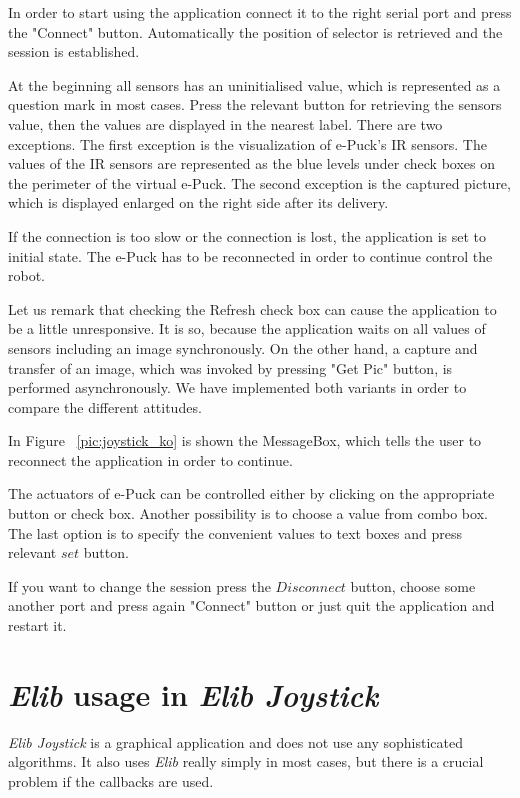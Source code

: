 	In order to start using the application connect it to the right serial port and press the "Connect" button.
	Automatically the position of selector is retrieved and the session is established.

	At the beginning all sensors has an uninitialised value, which is represented as a question mark 
	in most cases.
	Press the relevant button for retrieving the sensors value, then the values are displayed in the nearest label.
	There are two exceptions. The first exception is the visualization of e-Puck's IR sensors. 
	The values of the IR sensors
	are represented as the blue levels under check boxes on 
	the perimeter of the virtual e-Puck.
	The second  exception is the captured picture, which is displayed enlarged on the right side after its delivery.

	If the connection is too slow or the connection is lost, the application
	is set to initial state. The e-Puck has to be reconnected in order to continue control the robot.

	Let us remark that checking the Refresh check box can cause the application to be a little unresponsive.	
	It is so, because the application waits on all values of sensors including an image synchronously.
	On the other hand, a capture and transfer of an image, which was invoked by pressing "Get Pic" button,
	is performed asynchronously. 
	We have implemented both variants in order to compare the different attitudes.

	
	In Figure ~\ref{pic:joystick_ko} is shown the MessageBox, which tells the user to reconnect the application
	in order to continue.

	The actuators of e-Puck can be controlled either by clicking on the appropriate button or check box. 
	Another	possibility is to choose a value from combo box.
	The last option is to specify the  convenient values to text boxes and press relevant $set$ button.

	If you want to change the session press the $Disconnect$ button, choose some another port and 
	press again "Connect" button or	just quit the application and restart it.

	\section{{\it Elib} usage in {\it Elib Joystick}}\label{sec:joystick_trick}
	{\it Elib Joystick} is a graphical application and does not use any sophisticated algorithms. 
	It also uses {\it Elib} really simply in most cases, but there is a crucial problem if the callbacks are used.

